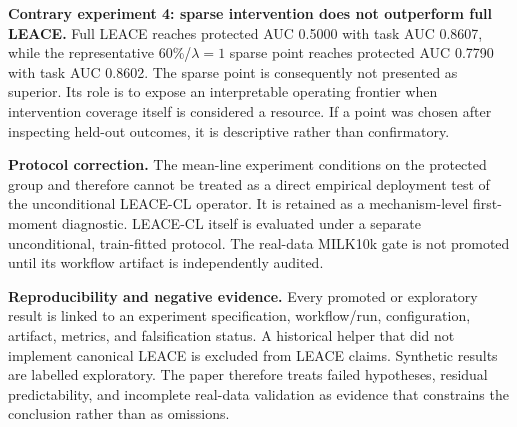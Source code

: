 \textbf{Contrary experiment 4: sparse intervention does not outperform full LEACE.} Full LEACE reaches protected AUC 0.5000 with task AUC 0.8607, while the representative 60\%/$\lambda=1$ sparse point reaches protected AUC 0.7790 with task AUC 0.8602. The sparse point is consequently not presented as superior. Its role is to expose an interpretable operating frontier when intervention coverage itself is considered a resource. If a point was chosen after inspecting held-out outcomes, it is descriptive rather than confirmatory.

\textbf{Protocol correction.} The mean-line experiment conditions on the protected group and therefore cannot be treated as a direct empirical deployment test of the unconditional LEACE-CL operator. It is retained as a mechanism-level first-moment diagnostic. LEACE-CL itself is evaluated under a separate unconditional, train-fitted protocol. The real-data MILK10k gate is not promoted until its workflow artifact is independently audited.

\textbf{Reproducibility and negative evidence.} Every promoted or exploratory result is linked to an experiment specification, workflow/run, configuration, artifact, metrics, and falsification status. A historical helper that did not implement canonical LEACE is excluded from LEACE claims. Synthetic results are labelled exploratory. The paper therefore treats failed hypotheses, residual predictability, and incomplete real-data validation as evidence that constrains the conclusion rather than as omissions.
